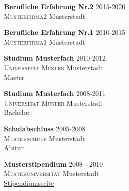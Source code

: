 \begin{body}
    \begin{experience}[Erfahrung]
        \begin{cvItem}
            \textbf{Berufliche Erfahrung Nr.2} \hfill 2015-2020\\
            \textsc{Musterfirma2} Musterstadt\\
            \lipsum[1]
        \end{cvItem}
        \begin{cvItem}
            \textbf{Berufliche Erfahrung Nr.1} \hfill 2010-2015\\
            \textsc{Musterfirma1} Musterstadt\\
            \lipsum[1]
        \end{cvItem}
    \end{experience}

    \begin{education}[Bildung]
        \begin{cvItem}
            \textbf{Studium Musterfach} \hfill 2010-2012\\
            \textsc{Universität Muster} Musterstadt\\
            Master
        \end{cvItem}

        \begin{cvItem}
            \textbf{Studium Musterfach} \hfill 2008-2011\\
            \textsc{Universität Muster} Musterstadt\\
            Bachelor
        \end{cvItem}

        \begin{cvItem}
            \textbf{Schulabschluss} \hfill 2005-2008\\
            \textsc{Musterschule} Musterstadt\\
            Abitur
        \end{cvItem}

    \end{education}

    \begin{scholarship}[Stipendum]
        \begin{cvItem}
            \textbf{Musterstipendium} \hfill 2008 - 2010\\
            \textsc{Musteruniversität} Musterstadt\\
            \href{https://www.google.de}{Stipendiumsseite}
            \end{cvItem}
    \end{scholarship}


\end{body}
